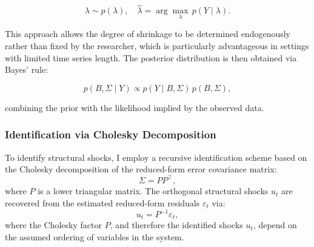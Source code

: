 \documentclass[12pt,a4paper]{report}\usepackage[a4paper, top=2.5cm, bottom=2.5cm, left=2.5cm, right=2.5cm]{geometry}
\begin{document}
\begin{equation}
\lambda \sim p(\lambda), \quad 
\hat{\lambda} = \arg\max_{\lambda} \, p(Y \mid \lambda).
\end{equation}

This approach allows the degree of shrinkage to be determined endogenously rather than 
fixed by the researcher, which is particularly advantageous in settings with limited 
time series length. The posterior distribution is then obtained via Bayes' rule:

\begin{equation}
p(B, \Sigma \mid Y) \propto p(Y \mid B, \Sigma)\, p(B, \Sigma),
\end{equation}

combining the prior with the likelihood implied by the observed data.

\subsubsection{Identification via Cholesky Decomposition}

To identify structural shocks, I employ a recursive identification scheme based on the 
Cholesky decomposition of the reduced-form error covariance matrix:
\begin{equation}
\Sigma = P P^\top,
\end{equation}
where $P$ is a lower triangular matrix. The orthogonal structural shocks $u_t$ are 
recovered from the estimated reduced-form residuals $\varepsilon_t$ via:
\begin{equation}
u_t = P^{-1} \varepsilon_t,
\end{equation}
where the Cholesky factor $P$, and therefore the identified shocks $u_t$, depend on 
the assumed ordering of variables in the system.
\end{document}
